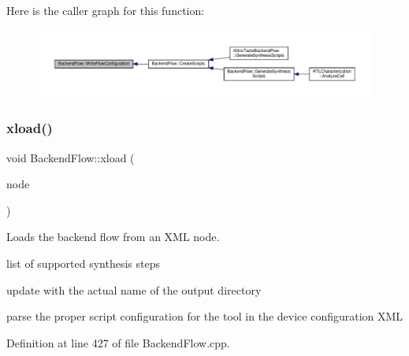 Here is the caller graph for this function\+:
\nopagebreak
\begin{figure}[H]
\begin{center}
\leavevmode
\includegraphics[width=350pt]{da/d75/classBackendFlow_acd93b1846b958eb6b7e10b9894bf5615_icgraph}
\end{center}
\end{figure}
\mbox{\label{classBackendFlow_a4cda12a4fef49b04b549029e69ff4551}} 
\subsubsection{\texorpdfstring{xload()}{xload()}}
{\footnotesize\ttfamily void Backend\+Flow\+::xload (\begin{DoxyParamCaption}\item[{const \hyperlink{classxml__element}{xml\+\_\+element} $\ast$}]{node }\end{DoxyParamCaption})\hspace{0.3cm}{\ttfamily [protected]}}



Loads the backend flow from an X\+ML node. 

list of supported synthesis steps

update with the actual name of the output directory

parse the proper script configuration for the tool in the device configuration X\+ML 

Definition at line 427 of file Backend\+Flow.\+cpp.



